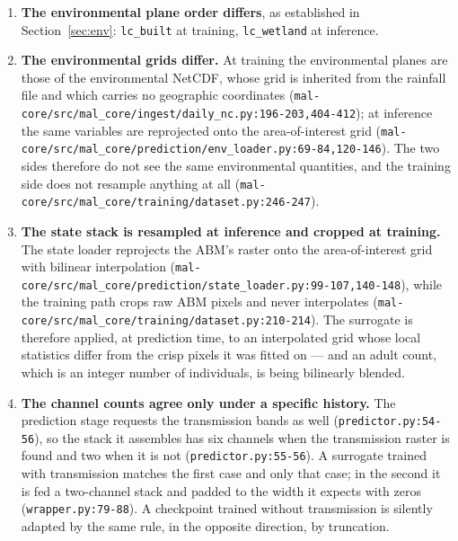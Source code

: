 \documentclass[11pt,a4paper]{article}
\newcommand{\codex}[1]{\texttt{#1}}
\begin{document}
\begin{enumerate}
\item \textbf{The environmental plane order differs}, as established in
      Section~\ref{sec:env}: \codex{lc\_\allowbreak{}built} at training,
      \codex{lc\_\allowbreak{}wetland} at inference.
\item \textbf{The environmental grids differ.} At training the environmental
      planes are those of the environmental NetCDF, whose grid is inherited
      from the rainfall file and which carries no geographic coordinates
      (\codex{mal-core/\allowbreak{}src/\allowbreak{}mal\_\allowbreak{}core/\allowbreak{}ingest/\allowbreak{}daily\_\allowbreak{}nc.py:196-203,404-412}); at
      inference the same variables are reprojected onto the
      area-of-interest grid
      (\codex{mal-core/\allowbreak{}src/\allowbreak{}mal\_\allowbreak{}core/\allowbreak{}prediction/\allowbreak{}env\_\allowbreak{}loader.py:69-84,120-146}). The two
      sides therefore do not see the same environmental quantities, and the
      training side does not resample anything at all
      (\codex{mal-core/\allowbreak{}src/\allowbreak{}mal\_\allowbreak{}core/\allowbreak{}training/\allowbreak{}dataset.py:246-247}).
\item \textbf{The state stack is resampled at inference and cropped at
      training.} The state loader reprojects the ABM's raster onto the
      area-of-interest grid with bilinear interpolation
      (\codex{mal-core/\allowbreak{}src/\allowbreak{}mal\_\allowbreak{}core/\allowbreak{}prediction/\allowbreak{}state\_\allowbreak{}loader.py:99-107,140-148}), while
      the training path crops raw ABM pixels and never interpolates
      (\codex{mal-core/\allowbreak{}src/\allowbreak{}mal\_\allowbreak{}core/\allowbreak{}training/\allowbreak{}dataset.py:210-214}). The
      surrogate is therefore applied, at prediction time, to an interpolated
      grid whose local statistics differ from the crisp pixels it was fitted
      on --- and an adult count, which is an integer number of individuals,
      is being bilinearly blended.
\item \textbf{The channel counts agree only under a specific history.} The
      prediction stage requests the transmission bands as well
      (\codex{predictor.py:54-56}), so the stack it assembles has six
      channels when the transmission raster is found and two when it is not
      (\codex{predictor.py:55-56}). A surrogate trained with transmission
      matches the first case and only that case; in the second it is fed a
      two-channel stack and padded to the width it expects with zeros
      (\codex{wrapper.py:79-88}). A checkpoint trained without transmission
      is silently adapted by the same rule, in the opposite direction, by
      truncation.
\end{enumerate}
\end{document}
